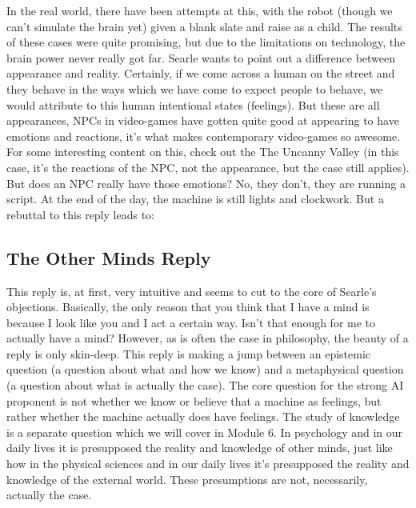     In the real world, there have been attempts at this, with the robot (though we can't simulate the brain yet) given a blank slate and raise as a child. The results of these cases were quite promising, but due to the limitations on technology, the brain power never really got far. Searle wants to point out a difference between appearance and reality. Certainly, if we come across a human on the street and they behave in the ways which we have come to expect people to behave, we would attribute to this human intentional states (feelings). But these are all appearances, NPCs in video-games have gotten quite good at appearing to have emotions and reactions, it's what makes contemporary video-games so awesome. For some interesting content on this, check out the The Uncanny Valley\autocite{extrahistory2012} (in this case, it's the reactions of the NPC, not the appearance, but the case still applies). But does an NPC really have those emotions? No, they don't, they are running a script. At the end of the day, the machine is still lights and clockwork. But a rebuttal to this reply leads to:
\subsection{The Other Minds Reply}

    This reply is, at first, very intuitive and seems to cut to the core of Searle's objections. Basically, the only reason that you think that I have a mind is because I look like you and I act a certain way. Isn't that enough for me to actually have a mind?  However, as is often the case in philosophy, the beauty of a reply is only skin-deep. This reply is making a jump between an epistemic question (a question about what and how we know) and a metaphysical question (a question about what is actually the case). The core question for the strong AI proponent is not whether we know or believe that a machine as feelings, but rather whether the machine actually does have feelings. The study of knowledge is a separate question which we will cover in Module 6. In psychology and in our daily lives it is presupposed the reality and knowledge of other minds, just like how in the physical sciences and in our daily lives it's presupposed the reality and knowledge of the external world. These presumptions are not, necessarily, actually the case.
